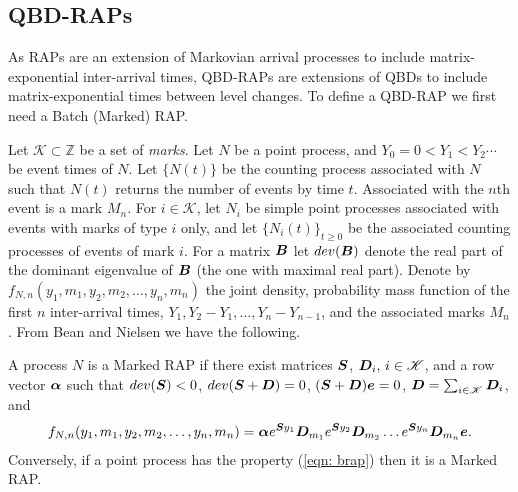 %
%

\subsection{QBD-RAPs}\label{sec: qbd-rap}
As RAPs are an extension of Markovian arrival processes to include matrix-exponential inter-arrival times, QBD-RAPs are extensions of QBDs to include matrix-exponential times between level changes. To define a QBD-RAP we first need a Batch (Marked) RAP. 

Let \(\mathscr K\subset \mathbb Z\) be a set of \emph{marks}. Let \(N\) be a point process, and \(Y_0=0<Y_1<Y_2\cdots\) be event times of \(N\). Let \(\{N(t)\}\) be the counting process associated with \(N\) such that \(N(t)\) returns the number of events by time \(t\). Associated with the \(n\)th event is a mark \(M_n\). For \(i\in\mathscr K\), let \(N_i\) be simple point processes associated with events with marks of type \(i\) only, and let \(\{N_i(t)\}_{t\geq 0}\) be the associated counting processes of events of mark \(i\). For a matrix \(\boldsymbol B\) let \(dev(\boldsymbol B)\) denote the real part of the dominant eigenvalue of \(\boldsymbol B\) (the one with maximal real part). Denote by \(f_{N,n}(y_1,m_1,y_2,m_2,\dots,y_n,m_n)\) the joint density, probability mass function of the first \(n\) inter-arrival times, \(Y_1,Y_2-Y_1,\dots,Y_n-Y_{n-1}\), and the associated marks \(M_n\). From Bean and Nielsen \cite[Theorem 1]{bn2010} we have the following. 
\begin{thm}
A process \(N\) is a Marked RAP if there exist matrices \(\boldsymbol S\), \(\boldsymbol D_i,\,i\in\mathscr K\), and a row vector \(\boldsymbol \alpha\) such that \(dev(\boldsymbol S)<0\), \(dev(\boldsymbol S+\boldsymbol D)=0\), \((\boldsymbol S+\boldsymbol D)\boldsymbol e = 0\), \(\boldsymbol D = \sum_{i\in\mathscr K} \boldsymbol D_i\), and 
\begin{align}f_{N,n}(y_1,m_1,y_2,m_2,\dots,y_n,m_n) = \boldsymbol \alpha e^{\boldsymbol S y_1}\boldsymbol D_{m_1} e^{\boldsymbol S y_2} \boldsymbol D_{m_2}\dots e^{\boldsymbol S y_n} \boldsymbol D_{m_n}\boldsymbol e.\label{eqn: brap}\end{align}
Conversely, if a point process has the property (\ref{eqn: brap}) then it is a Marked RAP.
\end{thm}

